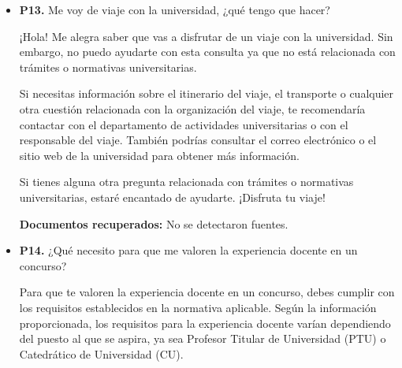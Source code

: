 \documentclass{article}
\begin{document}
\begin{itemize}
\begin{respuesta_agente}
Para calcular el costo por crédito, podemos dividir el importe total de los créditos (757.206 euros) entre el número de créditos (60). Esto nos daría un costo aproximado por crédito de:

757.206 euros / 60 créditos = 12.62 euros por crédito

Es importante tener en cuenta que este cálculo es aproximado y puede no reflejar el costo real por crédito, ya que no se tienen en cuenta otros posibles gastos o descuentos que puedan aplicarse.

En resumen, aunque no se proporciona una tasa de costo por crédito explícita en el contexto, podemos estimar que el costo por crédito sería de aproximadamente 12.62 euros, basándonos en el importe total de los créditos y el número de créditos. Sin embargo, se recomienda consultar la normativa específica de la Universidad de Sevilla o contactar con el departamento de matrícula para obtener información más precisa y actualizada.
    \end{respuesta_agente}
    \vspace{0.2cm}
    \noindent\textbf{Documentos recuperados:} No se detectaron fuentes.

  \item \textbf{P13.} Me voy de viaje con la universidad, ¿qué tengo que hacer? \\
    \begin{respuesta_agente}
      ¡Hola! Me alegra saber que vas a disfrutar de un viaje con la universidad. Sin embargo, no puedo ayudarte con esta consulta ya que no está relacionada con trámites o normativas universitarias.

Si necesitas información sobre el itinerario del viaje, el transporte o cualquier otra cuestión relacionada con la organización del viaje, te recomendaría contactar con el departamento de actividades universitarias o con el responsable del viaje. También podrías consultar el correo electrónico o el sitio web de la universidad para obtener más información.

Si tienes alguna otra pregunta relacionada con trámites o normativas universitarias, estaré encantado de ayudarte. ¡Disfruta tu viaje!
    \end{respuesta_agente}
    \vspace{0.2cm}
    \noindent\textbf{Documentos recuperados:} No se detectaron fuentes.

  \item \textbf{P14.} ¿Qué necesito para que me valoren la experiencia docente en un concurso? \\
    \begin{respuesta_agente}
      Para que te valoren la experiencia docente en un concurso, debes cumplir con los requisitos establecidos en la normativa aplicable. Según la información proporcionada, los requisitos para la experiencia docente varían dependiendo del puesto al que se aspira, ya sea Profesor Titular de Universidad (PTU) o Catedrático de Universidad (CU).


\end{respuesta_agente}
\end{itemize}
\end{document}
